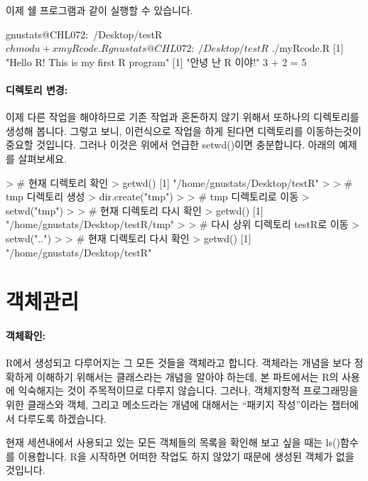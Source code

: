 이제 쉘 프로그램과 같이 실행할 수 있습니다. 
\begin{Schunk}
\begin{Soutput}
gnustats@CHL072:~/Desktop/testR$ chmod u+x myRcode.R
gnustats@CHL072:~/Desktop/testR$ ./myRcode.R
[1] "Hello R!  This is my first R program"
[1] "안녕 난 R 이야!"
3 + 2 = 5 
\end{Soutput}
\end{Schunk}

\paragraph{디렉토리 변경:}
이제 다른 작업을 해야하므로 기존 작업과 혼돈하지 않기 위해서 또하나의 디렉토리를 생성해 봅니다. 
그렇고 보니, 이런식으로 작업을 하게 된다면 디렉토리를 이동하는것이 중요할 것입니다. 
그러나 이것은 위에서 언급한 setwd()이면 충분합니다. 
아래의 예제를 살펴보세요.

\begin{Schunk}
\begin{Soutput}
> # 현재 디렉토리 확인 
> getwd()
[1] "/home/gnustats/Desktop/testR"
> 
> # tmp 디렉토리 생성 
> dir.create("tmp")
>
> # tmp 디렉토리로 이동 
> setwd("tmp")
> 
> # 현재 디렉토리 다시 확인 
> getwd()
[1] "/home/gnustats/Desktop/testR/tmp"
> 
> # 다시 상위 디렉토리 testR로 이동 
> setwd("..")
>
> # 현재 디렉토리 다시 확인 
> getwd()
[1] "/home/gnustats/Desktop/testR"
\end{Soutput}
\end{Schunk}


\section{객체관리}

\paragraph{객체확인: } R에서 생성되고 다루어지는 그 모든 것들을 객체라고 합니다. 
객체라는 개념을 보다 정확하게 이해하기 위해서는 클래스라는 개념을 알아야 하는데, 본 파트에서는 R의 사용에 익숙해지는 것이 주목적이므로 다루지 않습니다.
그러나, 객체지향적 프로그래밍을 위한 클래스와 객체, 그리고 메소드라는 개념에 대해서는 ``패키지 작성''이라는 챕터에서 다루도록 하겠습니다. 

현재 세션내에서 사용되고 있는 모든 객체들의 목록을 확인해 보고 싶을 때는 ls()함수를 이용합니다. 
R을 시작하면 어떠한 작업도 하지 않았기 때문에 생성된 객체가 없을 것입니다. 

